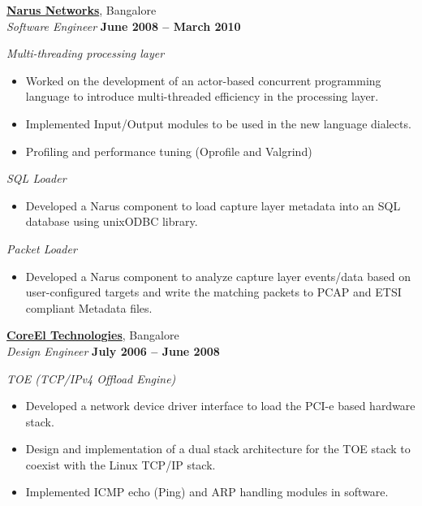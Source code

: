 \documentclass[a4paper,margin,line]{resume}
\begin{document}
\begin{resume}
    \href{http://www.narus.com/}{\textbf{Narus Networks}}, Bangalore \vspace{2mm}\\\vspace{1mm}%
    \textsl{Software Engineer} \hfill \textbf{June 2008 -- March 2010}%
	
	\textsl{Multi-threading processing layer}
	\begin{itemize}
		\item Worked on the development of an actor-based concurrent programming language to introduce multi-threaded efficiency in the processing layer.%
		\item Implemented Input/Output modules to be used in the new language dialects.%
		\item Profiling and performance tuning (Oprofile and Valgrind) %
	\end{itemize}

	\textsl{SQL Loader}
	\begin{itemize}
		\item Developed a Narus component to load capture layer metadata into an SQL database using unixODBC library. %
	\end{itemize}

	\textsl{Packet Loader}
	\begin{itemize}
		\item Developed a Narus component to analyze capture layer events/data based on user-configured targets and write the matching packets to PCAP and ETSI compliant Metadata files. \vspace{0mm}\\\vspace{1mm}%
	\end{itemize} 

    \href{http://www.coreel.com/}{\textbf{CoreEl Technologies}}, Bangalore \vspace{2mm}\\\vspace{1mm}%
    \textsl{Design Engineer} \hfill \textbf{July 2006 -- June 2008}%
	
	\textsl{TOE (TCP/IPv4 Offload Engine)}
	\begin{itemize}
		\item Developed a network device driver interface to load the PCI-e based hardware stack. %
		\item Design and implementation of a dual stack architecture for the TOE stack to coexist with the Linux TCP/IP stack. %
		\item Implemented ICMP echo (Ping) and ARP handling modules in software. %
	\end{itemize}
 

\end{resume}
\end{document}
